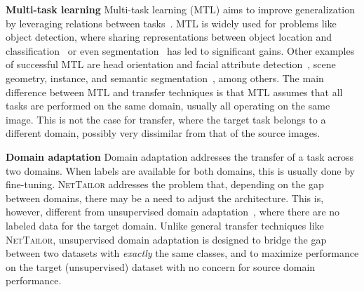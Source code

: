 \documentclass[10pt,twocolumn,letterpaper]{article}
\begin{document}
\noindent
{\bf Multi-task learning}
Multi-task learning (MTL) aims to improve generalization by leveraging relations between tasks~\cite{caruana1997multitask}. MTL is widely used for problems like object detection, where sharing representations between object location and classification~\cite{girshick2014rich, redmon2016you} or even segmentation~\cite{he2017mask} has led to significant gains. 
Other examples of successful MTL are head orientation and facial attribute detection~\cite{zhang2014facial, ranjan2017hyperface}, scene geometry, instance, and semantic segmentation~\cite{kendall2017multi, misra2016cross}, among others.
The main difference between MTL and transfer techniques is that MTL assumes that all tasks are performed on the same domain, usually all operating on the same image. This is not the case for transfer, where the target task belongs to a different domain, possibly very dissimilar from that of the source images.

\noindent
{\bf Domain adaptation}
Domain adaptation addresses the transfer of a task across two domains. 
When labels are available for both domains, this is usually done by fine-tuning. \textsc{NetTailor} addresses the problem that, depending on the gap between domains, there may be a need to adjust the architecture.
This is, however, different from unsupervised domain adaptation~\cite{ganin2015unsupervised, tzeng2015simultaneous,tzeng2017adversarial}, where there are no labeled data for the target domain. 
Unlike general transfer techniques like \textsc{NetTailor}, unsupervised domain adaptation is designed to bridge the gap between two datasets with \textit{exactly} the same classes, and to maximize performance on the target (unsupervised) dataset with no concern for source domain performance.
\end{document}
